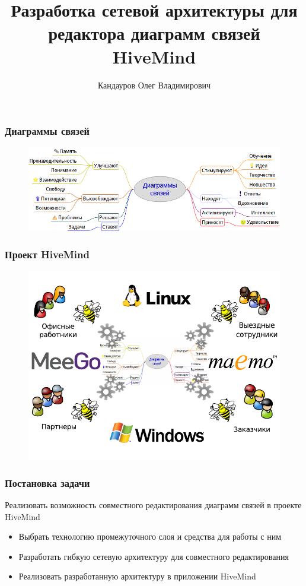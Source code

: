 \documentclass[unicode]{beamer}
\title[Разработка сетевой архитектуры в проекте HiveMind]{
Разработка сетевой архитектуры для редактора диаграмм связей HiveMind
}
\author[Кандауров О.\,В.]{Кандауров Олег Владимирович}
\institute{
Научный руководитель: ст. преподаватель Парамонов~И.\,В.
}
\date{}
\begin{document}
\maketitle
\large

\begin{frame}
\transwipe[direction=90]
\frametitle{Диаграммы связей}
\begin{figure}[h!] 
\centering
\includegraphics[width=\linewidth]{mindmap} 
\end{figure}
\end{frame}

\begin{frame}
\transwipe[direction=90]
\frametitle{Проект HiveMind}
\begin{figure}[h!] 
\centering
\includegraphics[scale=0.8]{crossplatform-collaboration} 
\end{figure}
\end{frame}

\begin{frame}
\transwipe[direction=90]
\frametitle{Постановка задачи}
Реализовать возможность совместного редактирования диаграмм связей в проекте
HiveMind

\begin{itemize}
  \item Выбрать технологию промежуточного слоя и средства для работы с ним
  \item Разработать гибкую сетевую архитектуру для совместного редактирования
  \item Реализовать разработанную архитектуру в приложении HiveMind
\end{itemize}
\end{frame}
\end{document}

